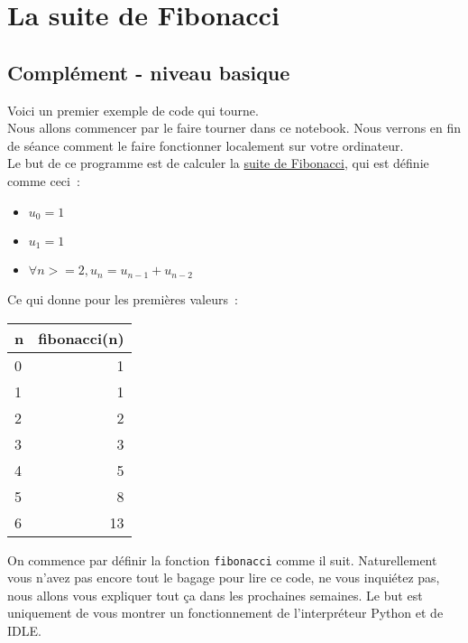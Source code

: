     \hypertarget{la-suite-de-fibonacci}{%
\section{La suite de Fibonacci}\label{la-suite-de-fibonacci}}

    \hypertarget{compluxe9ment---niveau-basique}{%
\subsection{Complément - niveau
basique}\label{compluxe9ment---niveau-basique}}

    Voici un premier exemple de code qui tourne.\\

Nous allons commencer par le faire tourner dans ce notebook. Nous
verrons en fin de séance comment le faire fonctionner localement sur
votre ordinateur.\\

    Le but de ce programme est de calculer la
\href{https://fr.wikipedia.org/wiki/Suite_de_Fibonacci}{suite de
Fibonacci}, qui est définie comme ceci~:

\begin{itemize}
\tightlist
\item
  \(u_0 = 1\)
\item
  \(u_1 = 1\)
\item
  \(\forall n >= 2, u_n = u_{n-1} + u_{n-2}\)
\end{itemize}

Ce qui donne pour les premières valeurs~:

    \begin{longtable}[]{@{}lr@{}}
\toprule
n & fibonacci(n)\tabularnewline
\midrule
\endhead
0 & 1\tabularnewline
1 & 1\tabularnewline
2 & 2\tabularnewline
3 & 3\tabularnewline
4 & 5\tabularnewline
5 & 8\tabularnewline
6 & 13\tabularnewline
\bottomrule
\end{longtable}

    On commence par définir la fonction \texttt{fibonacci} comme il suit.
Naturellement vous n'avez pas encore tout le bagage pour lire ce code,
ne vous inquiétez pas, nous allons vous expliquer tout ça dans les
prochaines semaines. Le but est uniquement de vous montrer un
fonctionnement de l'interpréteur Python et de IDLE.

